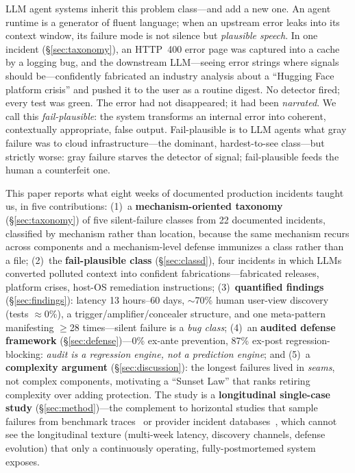 \documentclass[conference]{IEEEtran}
\newcommand{\failplausible}{\emph{fail-plausible}}
\begin{document}
LLM agent systems inherit this problem class---and add a new one. An agent
runtime is a generator of fluent language; when an upstream error leaks
into its context window, its failure mode is not silence but
\emph{plausible speech}. In one incident (\S\ref{sec:taxonomy}), an
HTTP~400 error page was captured into a cache by a logging bug, and the
downstream LLM---seeing error strings where signals should be---confidently
fabricated an industry analysis about a ``Hugging Face platform crisis''
and pushed it to the user as a routine digest. No detector fired; every
test was green. The error had not disappeared; it had been
\emph{narrated}. We call this \failplausible: the system transforms an
internal error into coherent, contextually appropriate, false output.
Fail-plausible is to LLM agents what gray failure was to cloud
infrastructure---the dominant, hardest-to-see class---but strictly worse:
gray failure starves the detector of signal; fail-plausible feeds the
human a counterfeit one.

This paper reports what eight weeks of documented production incidents
taught us, in five contributions: (1)~a \textbf{mechanism-oriented
taxonomy} (\S\ref{sec:taxonomy}) of five silent-failure classes from 22
documented incidents, classified by mechanism rather than location,
because the same mechanism recurs across components and a mechanism-level
defense immunizes a class rather than a file; (2)~the
\textbf{fail-plausible class} (\S\ref{sec:classd}), four incidents in
which LLMs converted polluted context into confident
fabrications---fabricated releases, platform crises, host-OS remediation
instructions; (3)~\textbf{quantified findings} (\S\ref{sec:findings}):
latency 13 hours--60 days, $\sim$70\% human user-view discovery (tests
$\approx$0\%), a trigger/amplifier/concealer structure, and one
meta-pattern manifesting $\geq$28 times---silent failure is a \emph{bug
class}; (4)~an \textbf{audited defense framework}
(\S\ref{sec:defense})---0\% ex-ante prevention, 87\% ex-post
regression-blocking: \emph{audit is a regression engine, not a prediction
engine}; and (5)~a \textbf{complexity argument}
(\S\ref{sec:discussion}): the longest failures lived in \emph{seams}, not
complex components, motivating a ``Sunset Law'' that ranks retiring
complexity over adding protection. The study is a \textbf{longitudinal
single-case study} (\S\ref{sec:method})---the complement to horizontal
studies that sample failures from benchmark traces~\cite{cemri2025mast} or
provider incident databases~\cite{ranganathan2025inference}, which cannot
see the longitudinal texture (multi-week latency, discovery channels,
defense evolution) that only a continuously operating, fully-postmortemed
system exposes.
\end{document}

